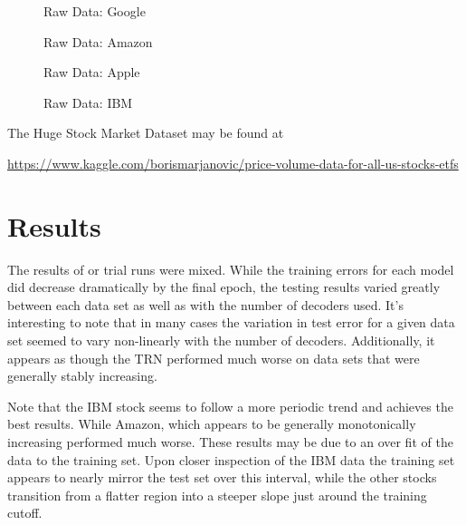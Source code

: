 \documentclass{article}
\begin{document}
    \begin{figure}[H]
      \centering
      \begin{minipage}[b]{0.4	\textwidth}
        \caption{Raw Data: Google}
      \end{minipage}
      \hfill
      \begin{minipage}[b]{0.4	\textwidth}
        \caption{Raw Data:  Amazon}
      \end{minipage}
    \end{figure}
    
    \begin{figure}[H]
      \centering
      \begin{minipage}[b]{0.4	\textwidth}
        \caption{Raw Data: Apple}
      \end{minipage}
      \hfill
      \begin{minipage}[b]{0.4	\textwidth}
        \caption{Raw Data: IBM}
      \end{minipage}
    \end{figure}

    The Huge Stock Market Dataset may be found at
    \begin{center}
      \url{https://www.kaggle.com/borismarjanovic/price-volume-data-for-all-us-stocks-etfs}
    \end{center}
\section{Results}
    The results of or trial runs were mixed. While the training errors for each model did decrease dramatically by the final epoch, the testing results varied greatly between each data set as well as with the number of decoders used. It’s interesting to note that in many cases the variation in test error for a given data set seemed to vary non-linearly with the number of decoders. Additionally, it appears as though the TRN performed much worse on data sets that were generally stably increasing.
    
    Note that the IBM stock seems to follow a more periodic trend and achieves the best results. While Amazon, which appears to be generally monotonically increasing performed much worse. These results may be due to an over fit of the data to the training set. Upon closer inspection of the IBM data the training set appears to nearly mirror the test set over this interval, while the other stocks transition from a flatter region into a steeper slope just around the training cutoff.
\end{document}
